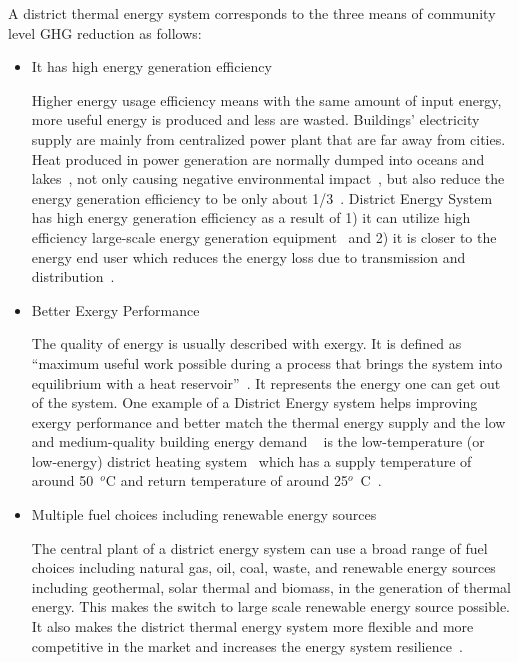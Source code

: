 A district thermal energy system corresponds to the three means of
community level GHG reduction as follows:
\begin{itemize}
\item It has high energy generation efficiency

  Higher energy usage efficiency means with the same amount of input
  energy, more useful energy is produced and less are
  wasted. Buildings' electricity supply are mainly from centralized
  power plant that are far away from cities. Heat produced in power
  generation are normally dumped into oceans and
  lakes~\cite{baird2014, IDEA2012}, not only causing negative
  environmental impact~\cite{wasteHeatEnviron}, but also reduce the
  energy generation efficiency to be only about
  1/3~\cite{IDEA2012}. District Energy System has high energy
  generation efficiency as a result of 1) it can utilize high
  efficiency large-scale energy generation equipment~\cite{IDEA2005}
  and 2) it is closer to the energy end user which reduces the energy
  loss due to transmission and distribution~\cite{IDEA2012}.

\item Better Exergy Performance 

  The quality of energy is usually described with exergy. It is
  defined as ``maximum useful work possible during a process that
  brings the system into equilibrium with a heat
  reservoir''~\cite{exergyWiki2015}. It represents the energy one can
  get out of the system. One example of a District Energy system helps
  improving exergy performance and better match the thermal energy
  supply and the low and medium-quality building energy demand
  ~\cite{Dobbelsteen2013} is the low-temperature (or low-energy)
  district heating system~\cite{Tol2012551} which has a supply
  temperature of around 50~$^o$C and return temperature of around
  25$^o$~C~\cite{Tol2012551}.

\item Multiple fuel choices including renewable energy sources

  The central plant of a district energy system can use a broad range
  of fuel choices including natural gas, oil, coal, waste, and
  renewable energy sources including geothermal, solar thermal and
  biomass, in the generation of thermal energy. This makes the switch
  to large scale renewable energy source possible. It also makes the
  district thermal energy system more flexible and more competitive in
  the market and increases the energy system
  resilience~\cite{IDEA2005, IDEA2012}.

\end{itemize}

